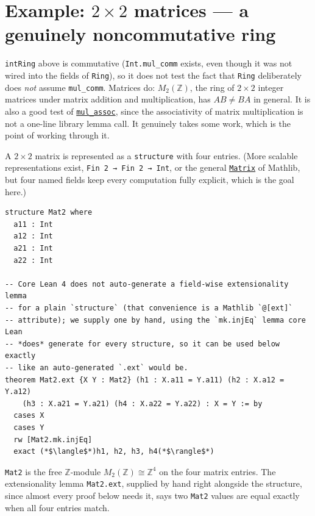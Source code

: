 \section{\texorpdfstring{Example: \(2\times 2\) matrices --- a genuinely noncommutative ring}{Example: 2\textbackslash times 2 matrices --- a genuinely noncommutative ring}}\label{sec:08-rings:07-matrices:1}

\texttt{intRing} above is commutative (\texttt{Int.mul\_\allowbreak{}comm} exists, even though it was not wired into the fields of \texttt{Ring}), so it does not test the fact that \texttt{Ring} deliberately does \emph{not} assume \texttt{mul\_\allowbreak{}comm}. Matrices do: \(M_2(\mathbb{Z})\), the ring of \(2\times 2\) integer matrices under matrix addition and multiplication, has \(AB \neq BA\) in general. It is also a good test of \href{https://loogle.lean-lang.org/?q=mul_assoc}{\texttt{mul\_\allowbreak{}assoc}}, since the associativity of matrix multiplication is not a one-line library lemma call. It genuinely takes some work, which is the point of working through it.

A \(2 \times 2\) matrix is represented as a \texttt{structure} with four entries. (More scalable representations exist, \texttt{Fin 2 → Fin 2 → Int}, or the general \href{https://loogle.lean-lang.org/?q=Matrix}{\texttt{Matrix}} of Mathlib, but four named fields keep every computation fully explicit, which is the goal here.)

\begin{lstlisting}
structure Mat2 where
  a11 : Int
  a12 : Int
  a21 : Int
  a22 : Int

-- Core Lean 4 does not auto-generate a field-wise extensionality lemma
-- for a plain `structure` (that convenience is a Mathlib `@[ext]`
-- attribute); we supply one by hand, using the `mk.injEq` lemma core Lean
-- *does* generate for every structure, so it can be used below exactly
-- like an auto-generated `.ext` would be.
theorem Mat2.ext {X Y : Mat2} (h1 : X.a11 = Y.a11) (h2 : X.a12 = Y.a12)
    (h3 : X.a21 = Y.a21) (h4 : X.a22 = Y.a22) : X = Y := by
  cases X
  cases Y
  rw [Mat2.mk.injEq]
  exact (*$\langle$*)h1, h2, h3, h4(*$\rangle$*)
\end{lstlisting}

\begin{mathreading}

\texttt{Mat2} is the free \(\mathbb{Z}\)-module \(M_2(\mathbb{Z}) \cong \mathbb{Z}^4\) on the four matrix entries. The extensionality lemma \texttt{Mat2.ext}, supplied by hand right alongside the structure, since almost every proof below needs it, says two \texttt{Mat2} values are equal exactly when all four entries match.

\end{mathreading}

